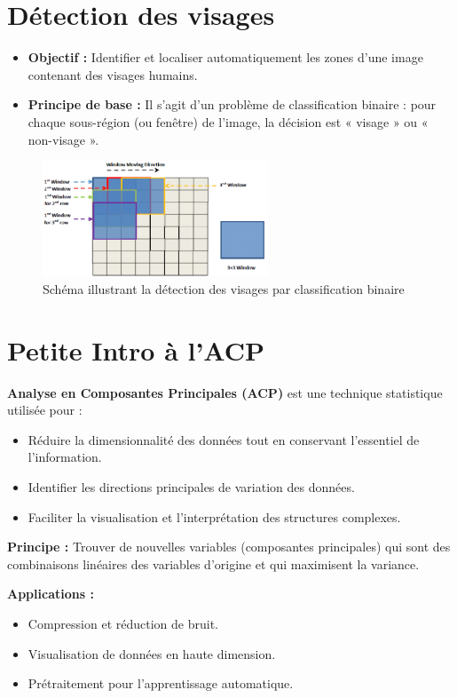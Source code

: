 \documentclass[a4paper,12pt]{report} %
\begin{document}
\chapter{Détection des visages}
\begin{itemize}
    \item \textbf{Objectif :}  
          Identifier et localiser automatiquement les zones d'une image contenant des visages humains.
    \item \textbf{Principe de base :}  
          Il s'agit d'un problème de classification binaire : pour chaque sous-région (ou fenêtre) de l'image, la décision est « visage » ou « non-visage ».
\end{itemize}
\begin{figure}[ht]
    \centering
    \includegraphics[width=0.6\textwidth]{sliding_window.png} %
    \caption{Schéma illustrant la détection des visages par classification binaire}
    \label{fig:face_detection}
\end{figure}

\chapter{Petite Intro à l'ACP}
\textbf{Analyse en Composantes Principales (ACP)} est une technique statistique utilisée pour :
\begin{itemize}
    \item Réduire la dimensionnalité des données tout en conservant l'essentiel de l'information.
    \item Identifier les directions principales de variation des données.
    \item Faciliter la visualisation et l'interprétation des structures complexes.
\end{itemize}

\textbf{Principe :} Trouver de nouvelles variables (composantes principales) qui sont des combinaisons linéaires des variables d'origine et qui maximisent la variance.

\textbf{Applications :}
\begin{itemize}
    \item Compression et réduction de bruit.
    \item Visualisation de données en haute dimension.
    \item Prétraitement pour l'apprentissage automatique.
\end{itemize}
\end{document}
